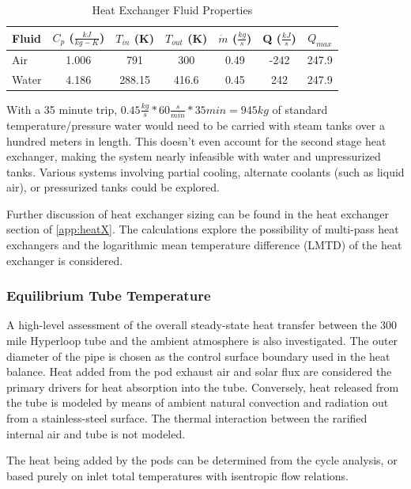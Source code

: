 \documentclass[heading.tex]{subfiles}
\begin{document}

\begin{table}
    \centering
    \caption{Heat Exchanger Fluid Properties}
    \label{tab:HeatEx}
    \begin{tabular}{l  c  c  c  c  c  c} 
        \hline
        Fluid & $C_{p}$ ($\frac{kJ}{kg-K}$)& $T_{in}$ (K) & $T_{out}$ (K) & $\dot{m}$ ($\frac{kg}{s}$) & Q ($\frac{kJ}{s}$) & $Q_{max}$\\ \hline 
        Air & 1.006 & 791 & 300 & 0.49 & -242 & 247.9\\ 
        Water & 4.186 & 288.15 & 416.6 &0.45 & 242 & 247.9\\ \hline
    \end{tabular}
\end{table}

With a 35 minute trip, $0.45 \frac{kg}{s} * 60 \frac{s}{min} * 35min = 945 kg$
of standard temperature/pressure water would need to be carried with steam tanks over a hundred meters in length.
This doesn't even account for the second stage heat exchanger, making the system nearly infeasible with water and unpressurized tanks.
Various systems involving partial cooling, alternate coolants (such as liquid air), or pressurized tanks could be explored.

Further discussion of heat exchanger sizing can be found in the heat exchanger section of \cref{app:heatX}.
The calculations explore the possibility of multi-pass heat exchangers
and the logarithmic mean temperature difference (LMTD) of the heat exchanger is considered.
\cite{Cengal}
\cite{Turns}


\subsubsection{Equilibrium Tube Temperature}
A high-level assessment of the overall steady-state heat transfer between the 300 mile Hyperloop tube and the ambient atmosphere is
also investigated. The outer diameter of the pipe is chosen as the control surface boundary used in the heat balance. Heat added from the pod exhaust
air and solar flux are considered the primary drivers for heat absorption into the tube. Conversely, heat released from the tube is modeled by means of
ambient natural convection and radiation out from a stainless-steel surface. The thermal interaction between the rarified internal air and
tube is not modeled.

The heat being added by the pods can be determined from the cycle analysis, or based purely on inlet total temperatures with isentropic
flow relations.
\end{document}

